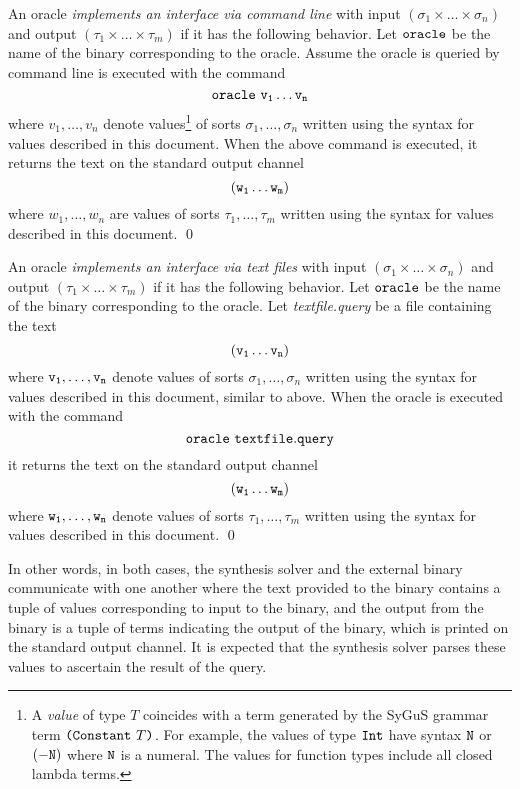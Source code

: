 \documentclass[english,a4paper,10pt]{article}
\begin{document}
\begin{definition}
An oracle \emph{implements an interface via command line} with input
$(\sigma_1 \times \ldots \times \sigma_n)$ and output
$(\tau_1 \times \ldots \times \tau_m)$ if
it has the following behavior.
Let ${\tt oracle}$ be the name of the binary corresponding to the oracle.
Assume the oracle is queried by command line is executed with the command
\[
{\tt oracle \,\, v_1 \ldots v_n}
\]
where $v_1, \ldots, v_n$ denote values\footnote{
A \emph{value} of type $T$ 
coincides with a term generated by the SyGuS grammar term
$\texttt{(}\texttt{Constant}\mbox{ }T\texttt{)}$.
For example, the values of type ${\tt Int}$
have syntax ${\tt N}$ or ${\tt (- N)}$ where ${\tt N}$ is a numeral.
The values for function types include all closed lambda terms.
} of sorts $\sigma_1, \ldots, \sigma_n$
written using the syntax for values described in this document.
When the above command is executed,
it returns the text on the standard output channel
\[
{\tt (w_{1} \ldots w_{m})}
\]
where $w_1, \ldots, w_n$ are values of sorts $\tau_1, \ldots, \tau_m$
written using the syntax for values described in this document.
\qed
\end{definition}

\begin{definition}
An oracle \emph{implements an interface via text files} with input
$(\sigma_1 \times \ldots \times \sigma_n)$ and output
$(\tau_1 \times \ldots \times \tau_m)$ if
it has the following behavior.
Let ${\tt oracle}$ be the name of the binary corresponding to the oracle.
Let \textit{textfile.query}
be a file containing the text
\[
{\tt (v_1 \ldots v_n)}
\]
where ${\tt v_1, \ldots, v_n}$ denote values of sorts $\sigma_1, \ldots, \sigma_n$
written using the syntax for values described in this document, similar to above.
When the oracle is executed with the command
\[
{\tt oracle \,\, textfile.query}
\]
it returns the text on the standard output channel
\[
{\tt (w_{1} \ldots w_{m})}
\]
where ${\tt w_1, \ldots, w_n}$ denote values of sorts $\tau_1, \ldots, \tau_m$
written using the syntax for values described in this document.
\qed
\end{definition}

In other words, in both cases, the synthesis solver and the external binary
communicate with one another where the text provided to the binary contains
a tuple of values corresponding to input to the binary, and the output
from the binary is a tuple of terms indicating the output of the binary,
which is printed on the standard output channel.
It is expected that the synthesis solver parses these values to
ascertain the result of the query.
\end{document}

